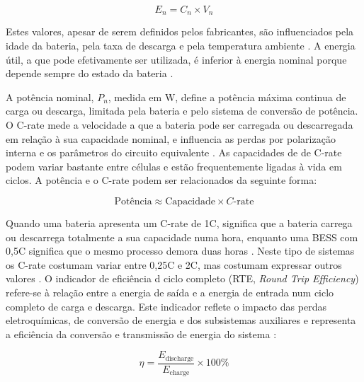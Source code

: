 \[
E_n = C_n \times V_n
\]

Estes valores, apesar de serem definidos pelos fabricantes, são influenciados pela idade da bateria, pela taxa de descarga e pela temperatura ambiente \cite{Ashok2022 }. A energia útil, a que pode efetivamente ser utilizada, é inferior à energia nominal porque depende sempre do estado da bateria \cite{INTERNATIONALSTANDARDNORMEINTERNATIONALE2017}. 

A potência nominal, $P_n$,  medida em W, define a potência máxima continua de carga ou descarga, limitada pela bateria e pelo sistema de conversão de potência. 
O C-rate mede a velocidade a que a bateria pode ser carregada ou descarregada em relação à sua capacidade nominal, e influencia as perdas por polarização interna e os parâmetros do circuito equivalente \cite{ Allahham2022}. As capacidades de de C-rate podem variar bastante entre células e estão frequentemente ligadas à vida em ciclos.  A potência e o C-rate podem ser relacionados da seguinte forma:

\[
\text{Potência} \approx \text{Capacidade} \times C\text{-rate}
\]

Quando uma bateria apresenta um C-rate de 1C, significa que a bateria carrega ou descarrega totalmente a sua capacidade numa hora, enquanto uma BESS com 0,5C significa que o mesmo processo demora duas horas \cite{TLS }.  Neste tipo de sistemas os C-rate costumam variar entre 0,25C e 2C, mas costumam expressar outros valores \cite{ Power }.
O indicador de eficiência d ciclo completo (RTE, \textit{Round Trip Efficiency}) refere-se à relação entre a energia de saída e a energia de entrada num ciclo completo de carga e descarga. Este indicador reflete o impacto das perdas eletroquímicas, de conversão de energia e dos subsistemas auxiliares e representa a eficiência da conversão e transmissão de energia do sistema \cite{ Kyeremeh2026}:


\[
\eta = \frac{E_{\text{discharge}}}{E_{\text{charge}}} \times 100\%
\]

